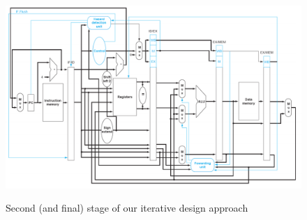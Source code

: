 \begin{figure}[h]
	\centering
	\caption{Second (and final) stage of our iterative design approach}
	\includegraphics[scale=0.5]{figures/design2.png}
	\label{fig:final-2-2-text}
\end{figure}
